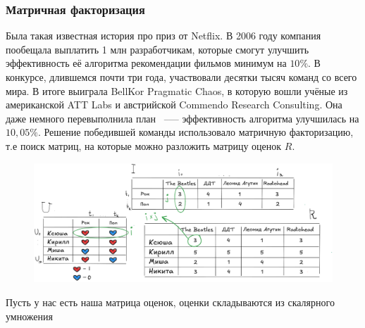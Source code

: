\documentclass[bachelor, och, referat]{shiza}
\begin{document}
\subsubsection{Матричная факторизация}
Была такая известная история про приз от Netflix. В 2006 году компания пообещала выплатить 1 млн разработчикам, которые смогут улучшить эффективность её алгоритма рекомендации фильмов минимум на $10\%$.
В конкурсе, длившемся почти три года, участвовали десятки тысяч команд со всего мира. В итоге выиграла BellKor Pragmatic Chaos,
в которую вошли учёные из американской ATT Labs и австрийской Commendo Research Consulting. Она даже немного перевыполнила план ~--— эффективность алгоритма улучшилась на $10,05\%$.
Решение победившей команды использовало матричную факторизацию, т.е поиск матриц, на которые можно разложить матрицу оценок $R$.

\begin{figure}[H]
  \centering
  \includegraphics[width=1\textwidth]{./5.png}
  \caption{}
\end{figure}
Пусть у нас есть наша матрица оценок, оценки складываются из скалярного умножения 
\end{document}
